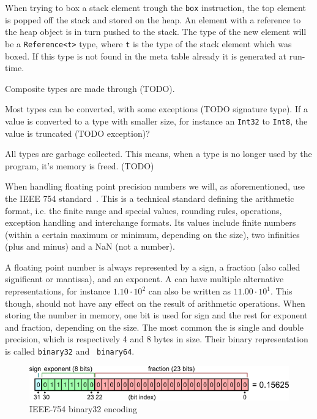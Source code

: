 When trying to box a stack element trough the {\tt box} instruction, the top
element is popped off the stack and stored on the heap. An element with a
reference to the heap object is in turn pushed to the stack. The type of the new
element will be a {\tt Reference<t>} type, where {\tt t} is the type of the
stack element which was boxed. If this type is not found in the meta table
already it is generated at run-time.

Composite types are made through (TODO).

Most types can be converted, with some exceptions (TODO signature type). If a
value is converted to a type with smaller size, for instance an {\tt Int32} to
{\tt Int8}, the value is truncated (TODO exception)?

All types are garbage collected. This means, when a type is no longer used by
the program, it's memory is freed. (TODO)


When handling floating point precision numbers we will, as aforementioned, use
the IEEE 754 standard~\cite{ieee754}. This is a technical standard defining the
arithmetic format, i.e. the finite range and special values, rounding rules,
operations, exception handling and interchange formats. Its values include
finite numbers (within a certain maximum or minimum, depending on the size), two
infinities (plus and minus) and a NaN (not a number).

A floating point number is always represented by a sign, a fraction (also called
significant or mantissa), and an exponent. A can have multiple alternative
representations, for instance $1.10 \cdot 10^2$ can also be written as
$11.00 \cdot 10^1$. This though, should not have any effect on the result of
arithmetic operations. When storing the number in memory, one bit is used for
sign and the rest for exponent and fraction, depending on the size. The most
common the is single and double precision, which is respectively 4 and 8 bytes
in size. Their binary representation is called {\tt binary32} and {\tt
  binary64}.

\begin{figure}[H]
  \centering
  \includegraphics[scale=0.7]{images/ieee32.png}
  \caption[Caption for LOF]{IEEE-754 binary32 encoding~\footnotemark}
\end{figure}

